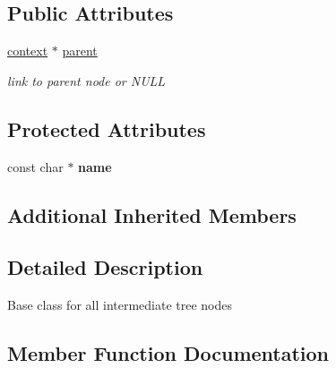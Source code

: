 \subsection*{Public Attributes}
\begin{DoxyCompactItemize}
\item 
\mbox{\label{classopt__explain__json__namespace_1_1context_ac79e3ff87bdb1ac8eec3a088a806a1c7}} 
\mbox{\hyperlink{classopt__explain__json__namespace_1_1context}{context}} $\ast$ \mbox{\hyperlink{classopt__explain__json__namespace_1_1context_ac79e3ff87bdb1ac8eec3a088a806a1c7}{parent}}
\begin{DoxyCompactList}\small\item\em link to parent node or N\+U\+LL \end{DoxyCompactList}\end{DoxyCompactItemize}
\subsection*{Protected Attributes}
\begin{DoxyCompactItemize}
\item 
\mbox{\label{classopt__explain__json__namespace_1_1context_ae0529ab278c63b7b8c27fc15ea0f1bfd}} 
const char $\ast$ {\bfseries name}
\end{DoxyCompactItemize}
\subsection*{Additional Inherited Members}


\subsection{Detailed Description}
Base class for all intermediate tree nodes 

\subsection{Member Function Documentation}
\mbox{\label{classopt__explain__json__namespace_1_1context_a3f7a03f0bf2a519a19b84cb5a99ee304}} 
